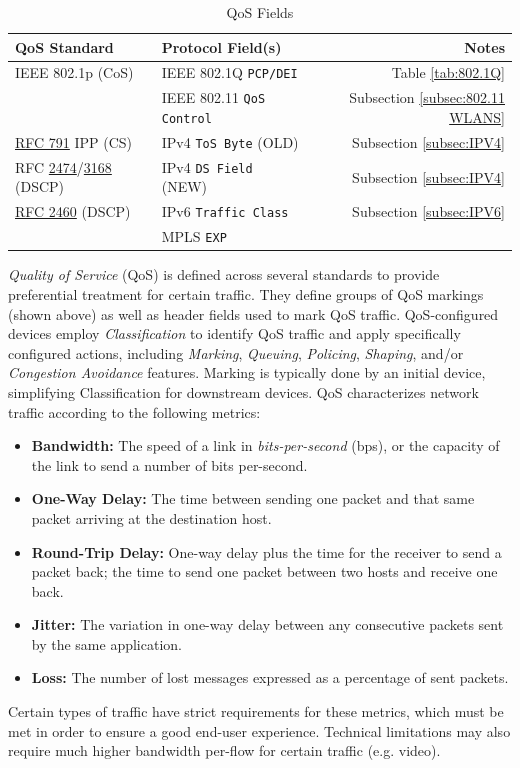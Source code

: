 \documentclass[12pt]{article}
\newcommand{\rfc}[1]{\href{https://datatracker.ietf.org/doc/html/rfc#1}{#1}}
\newcommand{\RFC}[1]{\href{https://datatracker.ietf.org/doc/html/rfc#1}{RFC #1}}
\begin{document}
	\begin{table}[H]
	\centering
	\caption{QoS Fields \label{tab:QOS FIELDS}}
	\begin{tabular}{llr}
	\hline
	\textbf{QoS Standard} 			& \textbf{Protocol Field(s)}		& \textbf{Notes}\\\hline
	IEEE 802.1p (CoS)				& IEEE 802.1Q \texttt{PCP/DEI} 	& Table \ref{tab:802.1Q}\\\hline
							& IEEE 802.11 \texttt{QoS Control} 	& Subsection \ref{subsec:802.11 WLANS}\\\hline
	\RFC{791} IPP (CS)			& IPv4 \texttt{ToS Byte} (OLD) 	& Subsection \ref{subsec:IPV4}\\
	RFC \rfc{2474}/\rfc{3168} (DSCP)	& IPv4 \texttt{DS Field} (NEW) 	& Subsection \ref{subsec:IPV4}\\\hline
	\RFC{2460} (DSCP)			& IPv6 \texttt{Traffic Class} 		& Subsection \ref{subsec:IPV6}\\\hline
							& MPLS \texttt{EXP}\\\hline
	\end{tabular}\end{table}
	\textit{Quality of Service} (QoS) is defined across several standards to provide preferential treatment for certain traffic. They define groups of QoS markings (shown above) as well as header fields used to mark QoS traffic. QoS-configured devices employ \textit{Classification} to identify QoS traffic and apply specifically configured actions, including \textit{Marking}, \textit{Queuing}, \textit{Policing}, \textit{Shaping}, and/or \textit{Congestion Avoidance} features. Marking is typically done by an initial device, simplifying Classification for downstream devices. QoS characterizes network traffic according to the following metrics:

	\begin{itemize}
		\label{itm:QOS METRICS}
		\item{\textbf{Bandwidth:} The speed of a link in \textit{bits-per-second} (bps), or the capacity of the link to send a number of bits per-second.}
		\item{\textbf{One-Way Delay:} The time between sending one packet and that same packet arriving at the destination host.}
		\item{\textbf{Round-Trip Delay:} One-way delay plus the time for the receiver to send a packet back; the time to send one packet between two hosts and receive 					one back.}
		\item{\textbf{Jitter:} The variation in one-way delay between any consecutive packets sent by the same application.}
		\item{\textbf{Loss:} The number of lost messages expressed as a percentage of sent packets.}
	\end{itemize}
	Certain types of traffic have strict requirements for these metrics, which must be met in order to ensure a good end-user experience. Technical limitations may also require much higher bandwidth per-flow for certain traffic (e.g. video).
	
\end{document}

